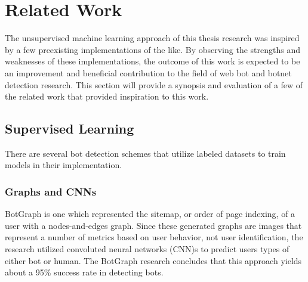 
\chapter{Related Work}\label{ch:related-work}
The unsupervised machine learning approach of this thesis research was inspired by a few preexisting implementations of the like.
By observing the strengths and weaknesses of these implementations, the outcome of this work is expected to be an improvement and beneficial contribution to the field of web bot and botnet detection research.
This section will provide a synopsis and evaluation of a few of the related work that provided inspiration to this work.

\section{Supervised Learning}\label{sec:supervised-learning}
There are several bot detection schemes that utilize labeled datasets to train models in their implementation.
\subsection{Graphs and CNNs}\label{subsec:graphs-and-cnns}
BotGraph is one which represented the sitemap, or order of page indexing, of a user with a nodes-and-edges graph.
Since these generated graphs are images that represent a number of metrics based on user behavior, not user identification, the research utilized convoluted neural networks (CNN)s to predict users types of either bot or human.
The BotGraph research concludes that this approach yields about a 95\% success rate in detecting bots.

